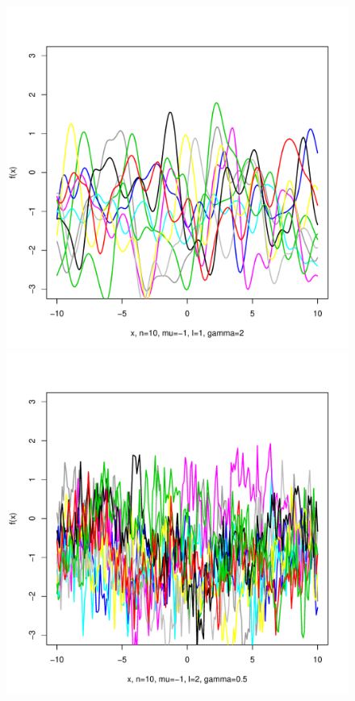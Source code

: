 \documentclass[12pt,letterpaper]{article}
\begin{document}
\begin{figure}
\begin{center}
\includegraphics[scale=0.2]{hw321/n10-m-1-l1-g4.pdf}
\includegraphics[scale=0.2]{hw321/n10-m-1-l2-g1.pdf}

\end{center}
\end{figure}
\end{document}
